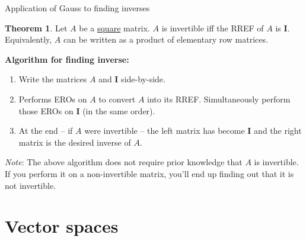 \documentclass[dvipsnames]{beamer}
\theoremstyle{definition}
\newtheorem{thm}{Theorem}
\begin{document}
\begin{frame}{Application of Gauss to finding inverses}
    \begin{thm}
        Let $A$ be a \underline{square} matrix. \pause $A$ is invertible iff the RREF of $A$ is $\mathbf{I}$. \pause
        Equivalently, $A$ can be written as a product of elementary row matrices.
    \end{thm} \pause

    \textbf{Algorithm for finding inverse:} \pause
    \begin{enumerate}[<+->]
        \item Write the matrices $A$ and $\mathbf{I}$ side-by-side.
        \item Performs EROs on $A$ to convert $A$ into its RREF. Simultaneously perform those EROs on $\mathbf{I}$ (in the same order).
        \item At the end -- if $A$ were invertible -- the left matrix has become $\mathbf{I}$ and the right matrix is the desired inverse of $A$.
    \end{enumerate} \pause

    \emph{Note}: The above algorithm does not require prior knowledge that $A$ is invertible. If you perform it on a non-invertible matrix, you'll end up finding out that it is not invertible.
\end{frame}

\section{Vector spaces}
\end{document}
